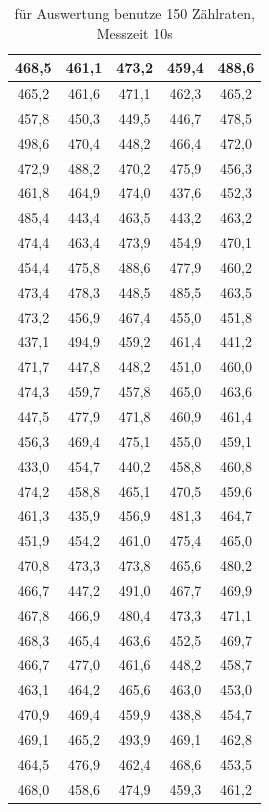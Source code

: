 \begin{table}[H]
\begin{tabular}{|c|c|c|c|c|}
\hline 
468,5	&461,1	&473,2	&459,4	&488,6\\ \hline
465,2	&461,6	&471,1	&462,3	&465,2\\ \hline
457,8	&450,3	&449,5	&446,7	&478,5\\ \hline
498,6	&470,4	&448,2	&466,4	&472,0\\ \hline
472,9	&488,2	&470,2	&475,9	&456,3\\ \hline
461,8	&464,9	&474,0	&437,6	&452,3\\ \hline
485,4	&443,4	&463,5	&443,2	&463,2\\ \hline
474,4	&463,4	&473,9	&454,9	&470,1\\ \hline
454,4	&475,8	&488,6	&477,9	&460,2\\ \hline
473,4	&478,3	&448,5	&485,5	&463,5\\ \hline
473,2	&456,9	&467,4	&455,0	&451,8\\ \hline
437,1	&494,9	&459,2	&461,4	&441,2\\ \hline
471,7	&447,8	&448,2	&451,0	&460,0\\ \hline
474,3	&459,7	&457,8	&465,0	&463,6\\ \hline
447,5	&477,9	&471,8	&460,9	&461,4\\ \hline
456,3	&469,4	&475,1	&455,0	&459,1\\ \hline
433,0	&454,7	&440,2	&458,8	&460,8\\ \hline
474,2	&458,8	&465,1	&470,5	&459,6\\ \hline
461,3	&435,9	&456,9	&481,3	&464,7\\ \hline
451,9	&454,2	&461,0	&475,4	&465,0\\ \hline
470,8	&473,3	&473,8	&465,6	&480,2\\ \hline
466,7	&447,2	&491,0	&467,7	&469,9\\ \hline
467,8	&466,9	&480,4	&473,3	&471,1\\ \hline
468,3	&465,4	&463,6	&452,5	&469,7\\ \hline
466,7	&477,0	&461,6	&448,2	&458,7\\ \hline
463,1	&464,2	&465,6	&463,0	&453,0\\ \hline
470,9	&469,4	&459,9	&438,8	&454,7\\ \hline
469,1	&465,2	&493,9	&469,1	&462,8\\ \hline
464,5	&476,9	&462,4	&468,6	&453,5\\ \hline
468,0	&458,6	&474,9	&459,3	&461,2\\ \hline 
\end{tabular} 
\caption{für Auswertung benutze 150 Zählraten, Messzeit 10s}
\label{tab_zaehlraten}
\end{table}

